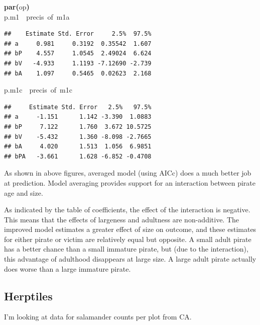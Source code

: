 \documentclass{article}
\makeatletter
\newcommand{\hlfunctioncall}[1]{\textcolor[rgb]{.5,0,.33}{\textbf{#1}}}%
\newcommand{\hlkeyword}[1]{\textbf{#1}}%
\newcommand{\hlcomment}[1]{\textcolor[rgb]{.18,.6,.34}{#1}}%
\newcommand{\hlsymbol}[1]{#1}%
\newcommand{\hlstd}[1]{\textcolor[rgb]{0,0,0}{#1}}%
\newenvironment{kframe}{%
 \def\FrameCommand##1{\hskip\@totalleftmargin \hskip-\fboxsep
 \colorbox{shadecolor}{##1}\hskip-\fboxsep
     \hskip-\linewidth \hskip-\@totalleftmargin \hskip\columnwidth}%
 \MakeFramed {\advance\hsize-\width
   \@totalleftmargin\z@ \linewidth\hsize
   \@setminipage}}%
 {\par\unskip\endMakeFramed}
\newenvironment{knitrout}{}{} %
\makeatother
\begin{document}
\begin{knitrout}
{\begin{kframe}
\begin{flushleft}
\hlstd{}\hlfunctioncall{par}\hlkeyword{(}\hlsymbol{op}\hlkeyword{)}\hspace*{\fill}\\
\hlstd{}\hlsymbol{p.m1}{\ }{\ }\hlcomment{\usebox{\hlnormalsizeboxhash}{\ }precis{\ }of{\ }m1a}\mbox{}
\normalfont
\end{flushleft}
\begin{verbatim}
##    Estimate Std. Error     2.5%  97.5%
## a     0.981     0.3192  0.35542  1.607
## bP    4.557     1.0545  2.49024  6.624
## bV   -4.933     1.1193 -7.12690 -2.739
## bA    1.097     0.5465  0.02623  2.168
\end{verbatim}
\begin{flushleft}
\ttfamily\noindent
\hlsymbol{p.m1c}{\ }{\ }\hlcomment{\usebox{\hlnormalsizeboxhash}{\ }precis{\ }of{\ }m1c}\mbox{}
\normalfont
\end{flushleft}
\begin{verbatim}
##     Estimate Std. Error   2.5%   97.5%
## a     -1.151      1.142 -3.390  1.0883
## bP     7.122      1.760  3.672 10.5725
## bV    -5.432      1.360 -8.098 -2.7665
## bA     4.020      1.513  1.056  6.9851
## bPA   -3.661      1.628 -6.852 -0.4708
\end{verbatim}
\end{kframe}}
\end{knitrout}


As shown in above figures, averaged model (using AICc) does a much better job at prediction.
Model averaging provides support for an interaction between pirate age and size. 

As indicated by the table of coefficients, the effect of the interaction is negative. 
This means that the effects of largeness and adultness are non-additive. 
The improved model estimates a greater effect of size on outcome, and these estimates for either pirate or victim are relatively equal but opposite. 
A small adult pirate has a better chance than a small immature pirate, but (due to the interaction), this advantage of adulthood disappears at large size. A large adult pirate actually does worse than a large immature pirate.


\subsection*{Herptiles}

I'm looking at data for salamander counts per plot from CA. 
\end{document}
